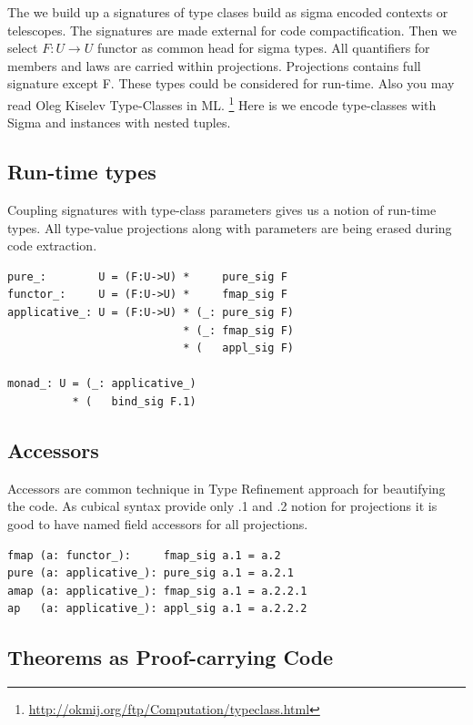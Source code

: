 \documentclass{article}
\begin{document}
The we build up a signatures of type clases build as sigma encoded contexts or telescopes.
The signatures are made external for code compactification.
Then we select $F: U \rightarrow U$ functor as common head for sigma types.
All quantifiers for members and laws are carried within projections.
Projections contains full signature except F. These types could be considered for run-time.
Also you may read Oleg Kiselev Type-Classes in ML. \footnote{\url{http://okmij.org/ftp/Computation/typeclass.html}}
Here is we encode type-classes with Sigma and instances with nested tuples.

\newpage
\subsection{Run-time types}

Coupling signatures with type-class parameters gives us a notion of run-time types.
All type-value projections along with parameters are being erased during code extraction.

\begin{lstlisting}[mathescape=true]
pure_:        U = (F:U->U) *     pure_sig F
functor_:     U = (F:U->U) *     fmap_sig F
applicative_: U = (F:U->U) * (_: pure_sig F)
                           * (_: fmap_sig F)
                           * (   appl_sig F)

monad_: U = (_: applicative_)
          * (   bind_sig F.1)
\end{lstlisting}

\subsection{Accessors}

Accessors are common technique in Type Refinement approach for beautifying the code.
As cubical syntax provide only .1 and .2 notion for projections it is good to have
named field accessors for all projections.

\begin{lstlisting}[mathescape=true]
fmap (a: functor_):     fmap_sig a.1 = a.2
pure (a: applicative_): pure_sig a.1 = a.2.1
amap (a: applicative_): fmap_sig a.1 = a.2.2.1
ap   (a: applicative_): appl_sig a.1 = a.2.2.2
\end{lstlisting}

\subsection{Theorems as Proof-carrying Code}
\end{document}
